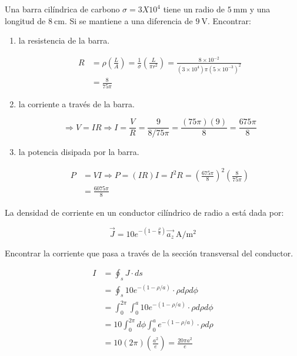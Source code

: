 \begin{problema}
    Una barra cilíndrica de carbono $\sigma=3 X 10^{4}$ tiene un radio de $5 \mathrm{~mm}$ y una longitud de $8 \mathrm{~cm}$. Si se mantiene a una diferencia de $9 \mathrm{~V}$. Encontrar:
    \begin{enumerate}
        \item la resistencia de la barra.
        \begin{sol}
            
$$
\begin{aligned}
R & =\rho\left(\frac{L}{A}\right)=\frac{1}{\sigma }\left(\frac{L}{\pi r^{2}}\right) = \frac{8 \times 10^{-2}}{\left(3 \times 10^{4}\right) \pi\left(5 \times 10^{-3}\right)^{2}} \\
& =\frac{8}{75 \pi}
\end{aligned}
$$
        \end{sol}
        \item  la corriente a través de la barra.
        \begin{sol}
            
$$
\Rightarrow V=I R \Rightarrow I=\frac{V}{R}=\frac{9}{8 / 75 \pi}=\frac{(75 \pi)(9)}{8}=\frac{675 \pi}{8}
$$
        \end{sol}
        \item  la potencia disipada por la barra.
        \begin{sol}
            $$
\begin{aligned}
P & =V I \Rightarrow P=(I R) I=I^{2} R=\left(\frac{675 \pi}{8}\right)^{2}\left(\frac{8}{75 \pi}\right) \\
& =\frac{6075 \pi}{8}
\end{aligned}
$$
        \end{sol}
    \end{enumerate}

\end{problema}

\begin{problema}
La densidad de corriente en un conductor cilíndrico de radio a está dada por:

$$
\vec{J}=10 e^{-\left(1-\frac{\rho}{a}\right)} \overrightarrow{a_{z}} \mathrm{~A} / \mathrm{m}^{2}
$$

Encontrar la corriente que pasa a través de la sección transversal del conductor.

\begin{sol}
    $$
\begin{aligned}
 I&=\oint_{s} J \cdot d s \\
& =\oint_{s} 10 e^{-(1-\rho / a)} \cdot \rho d \rho d \phi \\
& =\int_{0}^{2 \pi} \int_{0}^{a} 10 e^{-(1-\rho / a)} \cdot \rho d \rho d \phi \\
& =10 \int_{0}^{2 \pi} d \phi \int_{0}^{a} e^{-(1-\rho / a)} \cdot \rho d \rho\\
& =10(2 \pi)\left(\frac{a^{2}}{e}\right)=\frac{20 \pi a^{2}}{e}
\end{aligned}
$$
\end{sol}
\end{problema}

